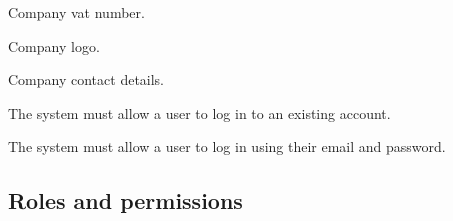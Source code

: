 \documentclass{article}
\begin{document}
\begin{list}{R.}{}
\begin{list}{R.}{}
\begin{list}{R..}{}
				\item Company vat number.
				\item Company logo.
				\item Company contact details.
			\end{list} 
		\end{list}
		\item The system must allow a user to log in to an existing account.
		\begin{list}{R.}{}
			\item The system must allow a user to log in using their email and password.
		\end{list}
	\end{list}
	
	\subsection*{Roles and permissions}	
\end{document}

